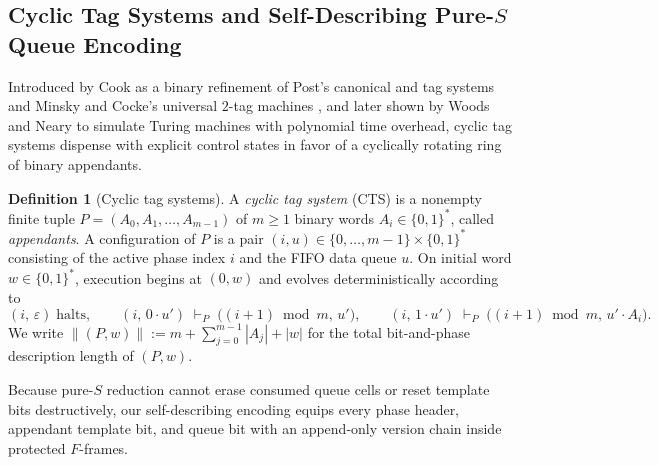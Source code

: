 \documentclass[11pt,reqno]{amsart}
\numberwithin{equation}{section}
\theoremstyle{plain}
\theoremstyle{definition}
\newtheorem{definition}[theorem]{Definition}
\theoremstyle{remark}
\begin{document}
\subsection{Cyclic Tag Systems and Self-Describing Pure-\texorpdfstring{$S$}{S} Queue Encoding}\label{subsec:cts-encode}

Introduced by Cook \cite{Cook2004Rule110} as a binary refinement of Post's canonical and tag systems \cite{Post1936FormulationI,Post1943Reductions} and Minsky and Cocke's universal $2$-tag machines \cite{Minsky1961Tag,CockeMinsky1964Tag}, and later shown by Woods and Neary \cite{WoodsNeary2006TagFOCS} to simulate Turing machines with polynomial time overhead, cyclic tag systems dispense with explicit control states in favor of a cyclically rotating ring of binary appendants.

\begin{definition}[Cyclic tag systems]\label{def:cts}
A \emph{cyclic tag system} (CTS) is a nonempty finite tuple $P = (A_0, A_1, \dots, A_{m-1})$ of $m \ge 1$ binary words $A_i \in \{0,1\}^*$, called \emph{appendants}. A configuration of $P$ is a pair $(i, u) \in \{0, \dots, m-1\} \times \{0,1\}^*$ consisting of the active phase index $i$ and the FIFO data queue $u$. On initial word $w \in \{0,1\}^*$, execution begins at $(0, w)$ and evolves deterministically according to
\[
  (i,\, \varepsilon) \;\text{halts}, \qquad
  (i,\, 0\cdot u') \;\vdash_P\; \bigl((i + 1) \bmod m,\, u'\bigr), \qquad
  (i,\, 1\cdot u') \;\vdash_P\; \bigl((i + 1) \bmod m,\, u'\cdot A_i\bigr).
\]
We write $\|(P, w)\| := m + \sum_{j=0}^{m-1} |A_j| + |w|$ for the total bit-and-phase description length of $(P, w)$.
\end{definition}

Because pure-$S$ reduction cannot erase consumed queue cells or reset template bits destructively, our self-describing encoding equips every phase header, appendant template bit, and queue bit with an append-only version chain inside protected $F$-frames.
\end{document}

